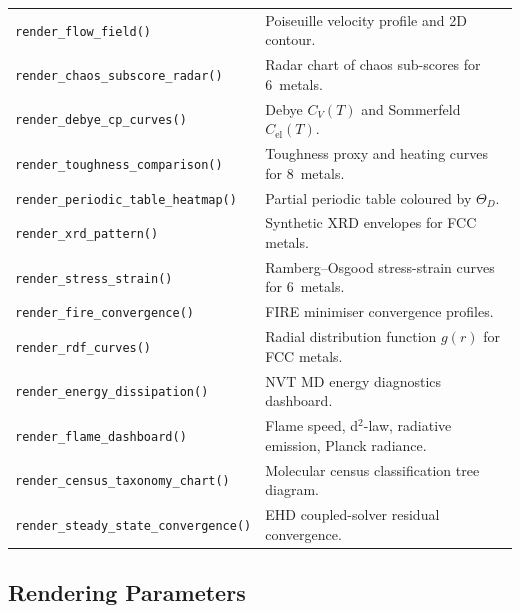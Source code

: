 \documentclass[11pt,a4paper]{article}
\begin{document}
\begin{center}
\begin{tabular}{lp{10cm}}
\texttt{render\_flow\_field()} & Poiseuille velocity profile and 2D
  contour. \\
\texttt{render\_chaos\_subscore\_radar()} & Radar chart of chaos sub-scores
  for 6~metals. \\
\texttt{render\_debye\_cp\_curves()} & Debye $C_V(T)$ and Sommerfeld
  $C_{\text{el}}(T)$. \\
\texttt{render\_toughness\_comparison()} & Toughness proxy and heating
  curves for 8~metals. \\
\texttt{render\_periodic\_table\_heatmap()} & Partial periodic table
  coloured by $\Theta_D$. \\
\texttt{render\_xrd\_pattern()} & Synthetic XRD envelopes for FCC
  metals. \\
\texttt{render\_stress\_strain()} & Ramberg--Osgood stress-strain curves
  for 6~metals. \\
\texttt{render\_fire\_convergence()} & FIRE minimiser convergence
  profiles. \\
\texttt{render\_rdf\_curves()} & Radial distribution function $g(r)$
  for FCC metals. \\
\texttt{render\_energy\_dissipation()} & NVT MD energy diagnostics
  dashboard. \\
\texttt{render\_flame\_dashboard()} & Flame speed, d$^2$-law, radiative
  emission, Planck radiance. \\
\texttt{render\_census\_taxonomy\_chart()} & Molecular census
  classification tree diagram. \\
\texttt{render\_steady\_state\_convergence()} & EHD coupled-solver
  residual convergence. \\
\bottomrule
\end{tabular}
\end{center}

\subsection{Rendering Parameters}
\end{document}
